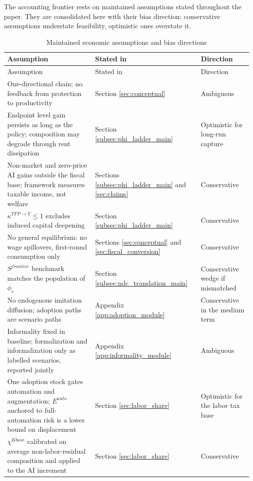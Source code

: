 \documentclass[11pt,a4paper]{article}
\begin{document}
The accounting frontier rests on maintained assumptions stated throughout the paper. They are consolidated here with their bias direction: conservative assumptions understate feasibility, optimistic ones overstate it.

\begin{longtable}{p{}p{}p{}}
\caption{Maintained economic assumptions and bias directions}\label{tab:maintained_assumptions_bias}\\
\toprule
Assumption & Stated in & Direction \\
\midrule
\endfirsthead
\toprule
Assumption & Stated in & Direction \\
\midrule
\endhead
One-directional chain; no feedback from protection to productivity & Section \ref{sec:conceptual} & Ambiguous \\
Endpoint level gain persists as long as the policy; composition may degrade through rent dissipation & Section \ref{subsec:phi_ladder_main} & Optimistic for long-run capture \\
Non-market and zero-price AI gains outside the fiscal base; framework measures taxable income, not welfare & Sections \ref{subsec:phi_ladder_main} and \ref{sec:claims} & Conservative \\
\(\kappa^{TFP\to Y}\leq1\) excludes induced capital deepening & Section \ref{subsec:phi_ladder_main} & Conservative \\
No general equilibrium: no wage spillovers, first-round consumption only & Sections \ref{sec:conceptual} and \ref{sec:fiscal_conversion} & Conservative \\
\(S^{frontier}\) benchmark matches the population of \(\phi_s\) & Section \ref{subsec:ndc_translation_main} & Conservative wedge if mismatched \\
No endogenous imitation diffusion; adoption paths are scenario paths & Appendix \ref{app:adoption_module} & Conservative in the medium term \\
Informality fixed in baseline; formalization and informalization only as labelled scenarios, reported jointly & Appendix \ref{app:informality_module} & Ambiguous \\
One adoption stock gates automation and augmentation; \(E^{auto}\) anchored to full-automation risk is a lower bound on displacement & Section \ref{sec:labor_share} & Optimistic for the labor tax base \\
\(\chi^{Kbase}\) calibrated on average non-labor-residual composition and applied to the AI increment & Section \ref{sec:labor_share} & Conservative \\

\end{longtable}
\end{document}
